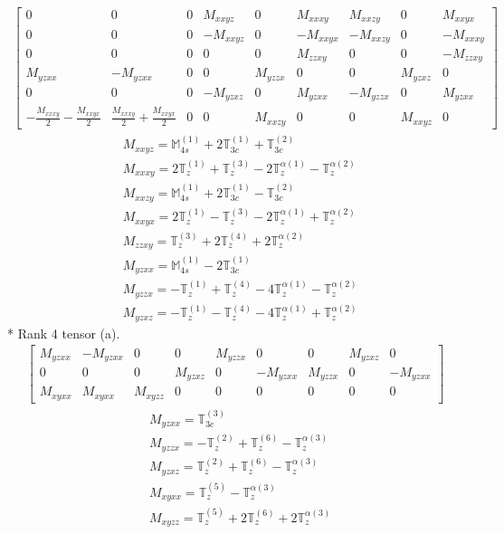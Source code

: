 \documentclass[fleqn,8pt,landscape]{jsarticle}
\begin{document}
\begin{align*}
\begin{bmatrix} 0 & 0 & 0 & M_{xxyz} & 0 & M_{xxxy} & M_{xxzy} & 0 & M_{xxyx} \\ 0 & 0 & 0 & - M_{xxyz} & 0 & - M_{xxyx} & - M_{xxzy} & 0 & - M_{xxxy} \\ 0 & 0 & 0 & 0 & 0 & M_{zzxy} & 0 & 0 & - M_{zzxy} \\ M_{yzxx} & - M_{yzxx} & 0 & 0 & M_{yzzx} & 0 & 0 & M_{yzxz} & 0 \\ 0 & 0 & 0 & - M_{yzxz} & 0 & M_{yzxx} & - M_{yzzx} & 0 & M_{yzxx} \\ - \frac{M_{xxxy}}{2} - \frac{M_{xxyx}}{2} & \frac{M_{xxxy}}{2} + \frac{M_{xxyx}}{2} & 0 & 0 & M_{xxzy} & 0 & 0 & M_{xxyz} & 0 \end{bmatrix}
\end{align*}
\begin{align*}
& M_{xxyz} = \mathbb{M}_{4s}^{(1)} + 2 \mathbb{T}_{3c}^{(1)} + \mathbb{T}_{3c}^{(2)} \\
& M_{xxxy} = 2 \mathbb{T}_{z}^{(1)} + \mathbb{T}_{z}^{(3)} - 2 \mathbb{T}_{z}^{\alpha(1)} - \mathbb{T}_{z}^{\alpha(2)} \\
& M_{xxzy} = \mathbb{M}_{4s}^{(1)} + 2 \mathbb{T}_{3c}^{(1)} - \mathbb{T}_{3c}^{(2)} \\
& M_{xxyx} = 2 \mathbb{T}_{z}^{(1)} - \mathbb{T}_{z}^{(3)} - 2 \mathbb{T}_{z}^{\alpha(1)} + \mathbb{T}_{z}^{\alpha(2)} \\
& M_{zzxy} = \mathbb{T}_{z}^{(3)} + 2 \mathbb{T}_{z}^{(4)} + 2 \mathbb{T}_{z}^{\alpha(2)} \\
& M_{yzxx} = \mathbb{M}_{4s}^{(1)} - 2 \mathbb{T}_{3c}^{(1)} \\
& M_{yzzx} = - \mathbb{T}_{z}^{(1)} + \mathbb{T}_{z}^{(4)} - 4 \mathbb{T}_{z}^{\alpha(1)} - \mathbb{T}_{z}^{\alpha(2)} \\
& M_{yzxz} = - \mathbb{T}_{z}^{(1)} - \mathbb{T}_{z}^{(4)} - 4 \mathbb{T}_{z}^{\alpha(1)} + \mathbb{T}_{z}^{\alpha(2)}
\end{align*}
* Rank 4 tensor (a).
\begin{align*}
\begin{bmatrix} M_{yzxx} & - M_{yzxx} & 0 & 0 & M_{yzzx} & 0 & 0 & M_{yzxz} & 0 \\ 0 & 0 & 0 & M_{yzxz} & 0 & - M_{yzxx} & M_{yzzx} & 0 & - M_{yzxx} \\ M_{xyxx} & M_{xyxx} & M_{xyzz} & 0 & 0 & 0 & 0 & 0 & 0 \end{bmatrix}
\end{align*}
\begin{align*}
& M_{yzxx} = \mathbb{T}_{3c}^{(3)} \\
& M_{yzzx} = - \mathbb{T}_{z}^{(2)} + \mathbb{T}_{z}^{(6)} - \mathbb{T}_{z}^{\alpha(3)} \\
& M_{yzxz} = \mathbb{T}_{z}^{(2)} + \mathbb{T}_{z}^{(6)} - \mathbb{T}_{z}^{\alpha(3)} \\
& M_{xyxx} = \mathbb{T}_{z}^{(5)} - \mathbb{T}_{z}^{\alpha(3)} \\
& M_{xyzz} = \mathbb{T}_{z}^{(5)} + 2 \mathbb{T}_{z}^{(6)} + 2 \mathbb{T}_{z}^{\alpha(3)}
\end{align*}
\end{document}
